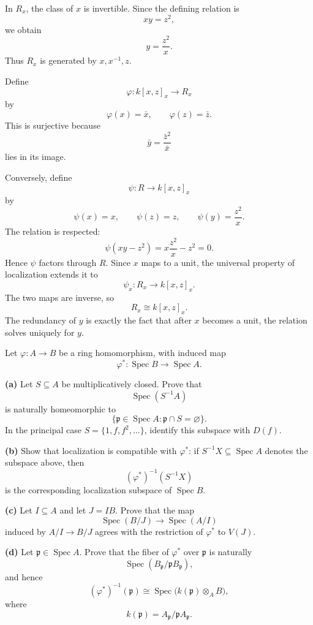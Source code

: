 \begin{solution}
In \(R_x\), the class of \(x\) is invertible. Since the defining relation is
\[
xy=z^2,
\]
we obtain
\[
y=\frac{z^2}{x}.
\]
Thus \(R_x\) is generated by \(x,x^{-1},z\).

Define
\[
\varphi:k[x,z]_x\longrightarrow R_x
\]
by
\[
\varphi(x)=\bar x,\qquad \varphi(z)=\bar z.
\]
This is surjective because
\[
\bar y=\frac{\bar z^2}{\bar x}
\]
lies in its image.

Conversely, define
\[
\psi:R\longrightarrow k[x,z]_x
\]
by
\[
\psi(x)=x,\qquad
\psi(z)=z,\qquad
\psi(y)=\frac{z^2}{x}.
\]
The relation is respected:
\[
\psi(xy-z^2)
=
x\frac{z^2}{x}-z^2
=
0.
\]
Hence \(\psi\) factors through \(R\). Since \(x\) maps to a unit, the universal
property of localization extends it to
\[
\psi_x:R_x\longrightarrow k[x,z]_x.
\]
The two maps are inverse, so
\[
R_x\cong k[x,z]_x.
\]
The redundancy of \(y\) is exactly the fact that after \(x\) becomes a unit,
the relation solves uniquely for \(y\).
\end{solution}


\begin{problem}[CP-V-0014]
\label{prob:cp-v-0014}
Let \(\varphi:A\to B\) be a ring homomorphism, with induced map
\[
\varphi^*:\operatorname{Spec}B\to\operatorname{Spec}A.
\]

\textbf{(a)} Let \(S\subseteq A\) be multiplicatively closed. Prove that
\[
\operatorname{Spec}(S^{-1}A)
\]
is naturally homeomorphic to
\[
\{\mathfrak p\in\operatorname{Spec}A:\mathfrak p\cap S=\varnothing\}.
\]
In the principal case \(S=\{1,f,f^2,\dots\}\), identify this subspace with
\(D(f)\).

\textbf{(b)} Show that localization is compatible with \(\varphi^*\): if
\(S^{-1}X\subseteq\operatorname{Spec}A\) denotes the subspace above, then
\[
(\varphi^*)^{-1}(S^{-1}X)
\]
is the corresponding localization subspace of \(\operatorname{Spec}B\).

\textbf{(c)} Let \(I\subseteq A\) and let \(J=IB\). Prove that the map
\[
\operatorname{Spec}(B/J)\longrightarrow\operatorname{Spec}(A/I)
\]
induced by \(A/I\to B/J\) agrees with the restriction of \(\varphi^*\) to
\(V(J)\).

\textbf{(d)} Let \(\mathfrak p\in\operatorname{Spec}A\). Prove that the fiber of
\(\varphi^*\) over \(\mathfrak p\) is naturally
\[
\operatorname{Spec}
\left(
B_{\mathfrak p}/\mathfrak pB_{\mathfrak p}
\right),
\]
and hence
\[
(\varphi^*)^{-1}(\mathfrak p)
\cong
\operatorname{Spec}\bigl(k(\mathfrak p)\otimes_A B\bigr),
\]
where
\[
k(\mathfrak p)=A_{\mathfrak p}/\mathfrak pA_{\mathfrak p}.
\]
\end{problem}

